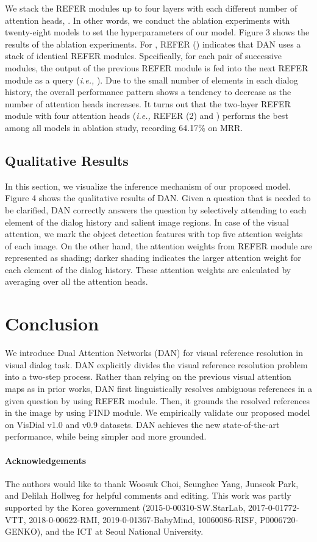 \documentclass[11pt,a4paper]{article}
\begin{document}
We stack the REFER modules up to four layers with each different number of attention heads, . In other words, we conduct the ablation experiments with twenty-eight models to set the hyperparameters of our model. Figure 3 shows the results of the ablation experiments. For , REFER () indicates that DAN uses a stack of  identical REFER modules. Specifically, for each pair of successive modules, the output of the previous REFER module is fed into the next REFER module as a query ({\it i.e.,} ). Due to the small number of elements in each dialog history, the overall performance pattern shows a tendency to decrease as the number of attention heads increases. It turns out that the two-layer REFER module with four attention heads ({\it i.e.,} REFER (2) and ) performs the best among all models in ablation study, recording 64.17\% on MRR. 

\subsection{Qualitative Results}
\label{sec:qual}
In this section, we visualize the inference mechanism of our proposed model. Figure 4 shows the qualitative results of DAN. 
Given a question that is needed to be clarified, DAN correctly answers the question by selectively attending to each element of the dialog history and salient image regions. In case of the visual attention, we mark the object detection features with top five attention weights of each image. On the other hand, the attention weights from REFER module are represented as shading; darker shading indicates the larger attention weight for each element of the dialog history. These attention weights are calculated by averaging over all the attention heads. 

\section{Conclusion}
We introduce Dual Attention Networks (DAN) for visual reference resolution in visual dialog task. DAN explicitly divides the visual reference resolution problem into a two-step process. Rather than relying on the previous visual attention maps as in prior works, DAN first linguistically resolves ambiguous references in a given question by using REFER module. Then, it grounds the resolved references in the image by using FIND module. We empirically validate our proposed model on VisDial v1.0 and v0.9 datasets. DAN achieves the new state-of-the-art performance, while being simpler and more grounded.

\paragraph{Acknowledgements}
The authors would like to thank Woosuk Choi, Seunghee Yang, Junseok Park, and Delilah Hollweg for helpful comments and editing. This work was partly supported by the Korea government (2015-0-00310-SW.StarLab, 2017-0-01772-VTT, 2018-0-00622-RMI, 2019-0-01367-BabyMind, 10060086-RISF, P0006720-GENKO), and the ICT at Seoul National University.



\end{document}

